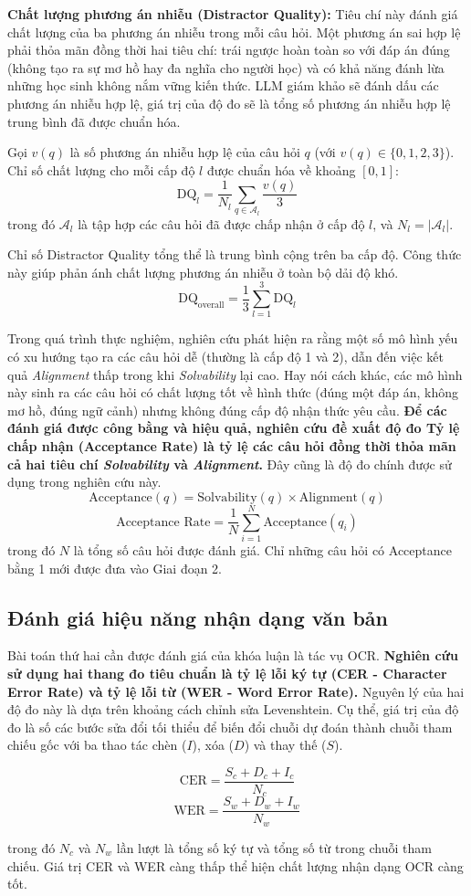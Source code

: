 \textbf{Chất lượng phương án nhiễu (Distractor Quality):} Tiêu chí này đánh giá chất lượng của ba phương án nhiễu trong mỗi câu hỏi. Một phương án sai hợp lệ phải thỏa mãn đồng thời hai tiêu chí: trái ngược hoàn toàn so với đáp án đúng (không tạo ra sự mơ hồ hay đa nghĩa cho người học) và có khả năng đánh lừa những học sinh không nắm vững kiến thức. LLM giám khảo sẽ đánh dấu các phương án nhiễu hợp lệ, giá trị của độ đo sẽ là tổng số phương án nhiễu hợp lệ trung bình đã được chuẩn hóa.

Gọi $v(q)$ là số phương án nhiễu hợp lệ của câu hỏi $q$ (với $v(q) \in \{0, 1, 2, 3\}$). Chỉ số chất lượng cho mỗi cấp độ $l$ được chuẩn hóa về khoảng $[0, 1]$:
$$\text{DQ}_l = \frac{1}{N_l} \sum_{q \in \mathcal{A}_l} \frac{v(q)}{3}$$
trong đó $\mathcal{A}_l$ là tập hợp các câu hỏi đã được chấp nhận ở cấp độ $l$, và $N_l = |\mathcal{A}_l|$.

Chỉ số Distractor Quality tổng thể là trung bình cộng trên ba cấp độ. Công thức này giúp phản ánh chất lượng phương án nhiễu ở toàn bộ dải độ khó.
$$\text{DQ}_{\text{overall}} = \frac{1}{3} \sum_{l=1}^{3} \text{DQ}_l$$

Trong quá trình thực nghiệm, nghiên cứu phát hiện ra rằng một số mô hình yếu có xu hướng tạo ra các câu hỏi dễ (thường là cấp độ 1 và 2), dẫn đến việc kết quả \textit{Alignment} thấp trong khi \textit{Solvability} lại cao. Hay nói cách khác, các mô hình này sinh ra các câu hỏi có chất lượng tốt về hình thức (đúng một đáp án, không mơ hồ, đúng ngữ cảnh) nhưng không đúng cấp độ nhận thức yêu cầu. \textbf{Để các đánh giá được công bằng và hiệu quả, nghiên cứu đề xuất độ đo Tỷ lệ chấp nhận (Acceptance Rate) là tỷ lệ các câu hỏi đồng thời thỏa mãn cả hai tiêu chí \textit{Solvability} và \textit{Alignment}.} Đây cũng là độ đo chính được sử dụng trong nghiên cứu này.
$$\text{Acceptance}(q) = \text{Solvability}(q) \times \text{Alignment}(q)$$
$$\text{Acceptance Rate} = \frac{1}{N} \sum_{i=1}^{N} \text{Acceptance}(q_i)$$
trong đó $N$ là tổng số câu hỏi được đánh giá. Chỉ những câu hỏi có Acceptance bằng 1 mới được đưa vào Giai đoạn 2.

\subsection{Đánh giá hiệu năng nhận dạng văn bản}

Bài toán thứ hai cần được đánh giá của khóa luận là tác vụ OCR. \textbf{Nghiên cứu sử dụng hai thang đo tiêu chuẩn là tỷ lệ lỗi ký tự (CER - Character Error Rate) và tỷ lệ lỗi từ (WER - Word Error Rate).} Nguyên lý của hai độ đo này là dựa trên khoảng cách chỉnh sửa Levenshtein. Cụ thể, giá trị của độ đo là số các bước sửa đổi tối thiểu để biến đổi chuỗi dự đoán thành chuỗi tham chiếu gốc với ba thao tác chèn ($I$), xóa ($D$) và thay thế ($S$).

$$\text{CER} = \frac{S_c + D_c + I_c}{N_c}$$
$$\text{WER} = \frac{S_w + D_w + I_w}{N_w}$$

trong đó $N_c$ và $N_w$ lần lượt là tổng số ký tự và tổng số từ trong chuỗi tham chiếu. Giá trị CER và WER càng thấp thể hiện chất lượng nhận dạng OCR càng tốt.
